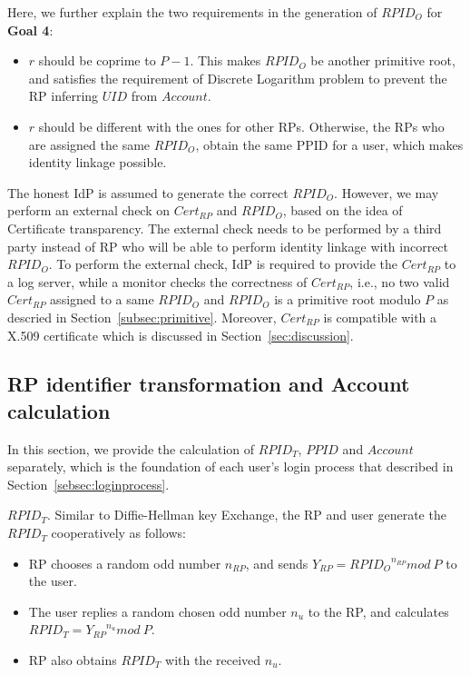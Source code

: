 Here, we further explain the two requirements in the generation of $RPID_O$ for \textbf{Goal 4}:
\begin{itemize}
  \item $r$ should be coprime to $P-1$. This makes $RPID_O$ be another primitive root, and satisfies the requirement of Discrete Logarithm problem to prevent the RP  inferring $UID$ from $Account$.
  \item $r$ should be different with the ones for other RPs. Otherwise, the RPs who are assigned the same $RPID_O$, obtain the same PPID for a user, which makes identity linkage possible.
\end{itemize}

The honest IdP is assumed to generate the correct $RPID_O$. However, we may perform an external check on $Cert_{RP}$ and $RPID_O$, based on the idea of Certificate transparency. The external check needs to be performed by a third party instead of RP who will be able to perform identity linkage with incorrect $RPID_O$. To perform the external check, IdP is required to provide the $Cert_{RP}$ to a log server, while a monitor checks the correctness of $Cert_{RP}$, i.e., no two valid $Cert_{RP}$ assigned to a same $RPID_O$ and $RPID_O$ is a primitive root modulo $P$ as descried in Section~\ref{subsec:primitive}. Moreover, $Cert_{RP}$ is compatible with a X.509 certificate which is discussed in Section~\ref{sec:discussion}.

\subsection{RP identifier transformation and Account calculation}
\label{subsec:identifier-generation}
In this section, we provide the calculation of $RPID_T$, $PPID$ and $Account$ separately, which is the foundation of each user's login process that described in Section~\ref{sebsec:loginprocess}.

{$RPID_T$}. Similar to Diffie-Hellman key Exchange\cite{DiffieH76}, the RP and user generate the  $RPID_T$ cooperatively as follows:
\begin{itemize}
  \item RP chooses a random odd number $n_{RP}$, and sends $Y_{RP} = {RPID_O}^{n_{RP}} mod \ P$ to the user.
  \item The user replies a random chosen odd number $n_{u}$ to the RP, and calculates $RPID_T = {Y_{RP}}^{n_{u}} mod \ P$.
  \item RP also obtains $RPID_T$ with the received $n_{u}$.
\end{itemize}


